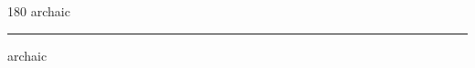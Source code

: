 
\begin{frame}
\begin{center}
\begin{turn}{180}
{\fontsize{2.5cm}{1em}\selectfont archaic}
\end{turn}
\vspace{1em}\par  
\hrule
\vspace{1em}\par  
{\fontsize{2.5cm}{1em}\selectfont archaic}
\end{center}
\end{frame}

